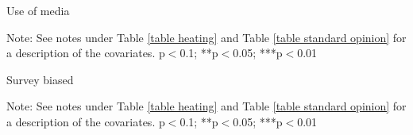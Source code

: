 \documentclass{article}
\begin{document}
\begin{table}[h!]
	\caption{Use of media}
	\begin{center}
		\scalebox{0.7}{}
	\end{center}
	{\footnotesize Note: See notes under Table \ref{table heating} and Table \ref{table standard opinion} for a description of the covariates.
	\newline *p$<$0.1; **p$<$0.05; ***p$<$0.01}
\end{table}	

\begin{table}[h!]
	\caption{Survey biased}
	\begin{center}
		\scalebox{0.7}{}
	\end{center}
	{\footnotesize Note: See notes under Table \ref{table heating} and Table \ref{table standard opinion} for a description of the covariates.
	\newline *p$<$0.1; **p$<$0.05; ***p$<$0.01}
\end{table}	
\end{document}
